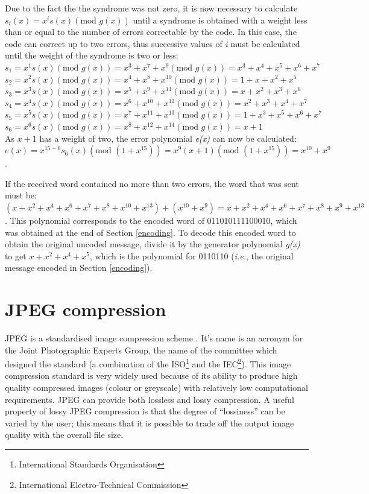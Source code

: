\documentclass[12pt]{report}
\begin{document}
Due to the fact the the syndrome was not zero, it is now necessary to calculate $s_{i}(x) = x^{i}s(x)(\mbox{mod } g(x))$
until a syndrome is obtained with a weight less than or equal to the number of errors correctable by the code. In this case,
the code can correct up to two errors, thus successive values of \emph{i} must be calculated until the weight of the syndrome
is two or less: \\
$s_{1} = x^{1} s(x)(\mbox{mod } g(x)) = x^{3} + x^{7} + x^{9} (\mbox{mod } g(x)) = x^{3}+x^{4}+x^{5}+x^{6}+x^{7}$ \\
$s_{2} = x^{2} s(x)(\mbox{mod } g(x)) = x^{4} + x^{8} + x^{10} (\mbox{mod } g(x)) = 1+x+x^{2}+x^{5}$ \\
$s_{3} = x^{3} s(x)(\mbox{mod } g(x)) = x^{5} + x^{9} + x^{11} (\mbox{mod } g(x)) = x+x^{2}+x^{3}+x^{6}$ \\
$s_{4} = x^{4} s(x)(\mbox{mod } g(x)) = x^{6} + x^{10} + x^{12} (\mbox{mod } g(x)) = x^{2}+x^{3}+x^{4}+x^{7}$ \\
$s_{5} = x^{5} s(x)(\mbox{mod } g(x)) = x^{7} + x^{11} + x^{13} (\mbox{mod } g(x)) = 1+x^{3}+x^{5}+x^{6}+x^{7}$ \\
$s_{6} = x^{6} s(x)(\mbox{mod } g(x)) = x^{8} + x^{12} + x^{14} (\mbox{mod } g(x)) = x+1$ \\
As $x + 1$ has a weight of two, the error polynomial \emph{e(x)} can now be calculated: 
$e(x) = x^{15-6}s_{6}(x)(\mbox{mod }(1+x^{15})) = x^{9}(x+1)(\mbox{mod }(1+x^{15})) = x^{10}+x^{9}$. 

If the received word contained no more than two errors, the word that was sent must be: 
$(x+x^{2}+x^{4}+x^{6}+x^{7}+x^{8}+x^{10}+x^{13}) + (x^{10}+x^{9}) = x+x^{2}+x^{4}+x^{6}+x^{7}+x^{8}+x^{9}+x^{13}$.
This polynomial corresponds to the encoded word of 011010111100010, which was obtained at the end of Section \ref{encoding}.
To decode this encoded word to obtain the original uncoded message, divide it by the generator polynomial \emph{g(x)} to 
get $x+x^{2}+x^{4}+x^{5}$, which is the polynomial for 0110110 (\emph{i.e.}, the original message encoded in Section \ref{encoding}).

			
\chapter{JPEG compression}
\label{chapter:jpg}
JPEG is a standardised image compression scheme \cite{jpgBook, haskell}. 
It's name is an acronym for 
the Joint Photographic Experts Group, the name of the committee which 
designed the standard (a combination of the 
ISO\footnote{International Standards Organisation}
and the IEC\footnote{International Electro-Technical Commission}).
This image compression standard is very widely used because of its 
ability to produce high quality compressed images (colour or greyscale) with 
relatively low computational requirements.
JPEG can provide both lossless and lossy compression. A useful 
property of lossy JPEG compression is that the degree of ``lossiness''
can be varied by the user; this means that it is possible to trade off the 
output image quality with the overall file size. 
\end{document}
